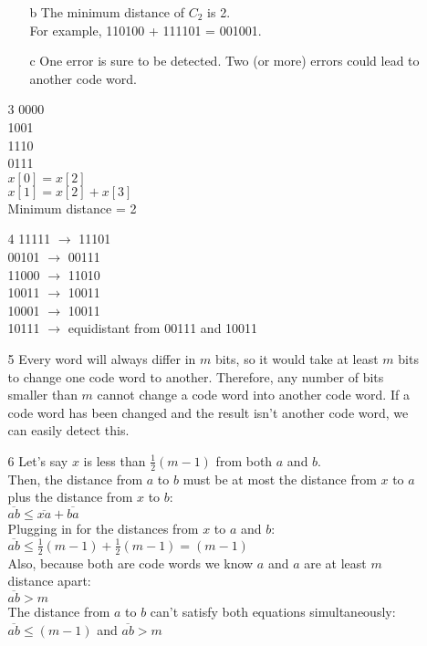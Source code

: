 \begin{enumerate}
\begin{enumerate}
\begin{enumerate}
\item[b]
The minimum distance of $C_2$ is 2. \\
For example, 110100 + 111101 = 001001. \\

\item[c]
One error is sure to be detected. Two (or more) errors could lead to another code word.

\end{enumerate}

\item[3]
0000 \\
1001 \\
1110 \\
0111 \\

$x[0] = x[2]$ \\
$x[1] = x[2] + x[3]$ \\

Minimum distance = 2 \\

\item[4]
11111 $\rightarrow$ 11101\\
00101 $\rightarrow$ 00111\\
11000 $\rightarrow$ 11010\\
10011 $\rightarrow$ 10011\\
10001 $\rightarrow$ 10011\\
10111 $\rightarrow$ equidistant from 00111 and 10011\\

\item[5]
Every word will always differ in $m$ bits, so it would take at least $m$ bits to change one code word to another. Therefore, any number of bits smaller than $m$ cannot change a code word into another code word. If a code word has been changed and the result isn't another code word, we can easily detect this.

\item[6]
Let's say $x$ is less than $\frac{1}{2}(m-1)$ from both $a$ and $b$. \\
Then, the distance from $a$ to $b$ must be at most the distance from $x$ to $a$ plus the distance from $x$ to $b$: \\
$\overline{ab} \leq \overline{xa} + \overline{ba}$ \\
Plugging in for the distances from $x$ to $a$ and $b$: \\
$ \overline{ab} \leq \frac{1}{2}(m-1) + \frac{1}{2}(m-1) = (m-1)$ \\
Also, because both are code words we know $a$ and $a$ are at least $m$ distance apart: \\
$\overline{ab} > m$ \\
The distance from $a$ to $b$ can't satisfy both equations simultaneously: \\
$\overline{ab} \leq (m-1)$ and $\overline{ab} > m$ \\


\end{enumerate}
\end{enumerate}
